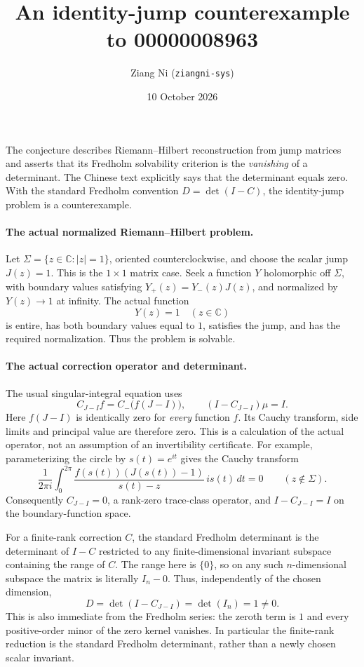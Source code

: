 \documentclass[11pt]{article}
\title{An identity-jump counterexample to 00000008963}
\author{Ziang Ni (\texttt{ziangni-sys})}
\date{10 October 2026}
\begin{document}
\maketitle
The conjecture describes Riemann--Hilbert reconstruction from jump
matrices and asserts that its Fredholm solvability criterion is the
\emph{vanishing} of a determinant. The Chinese text explicitly says
that the determinant equals zero. With the standard Fredholm
convention $D=\det(I-C)$, the identity-jump problem is a counterexample.

\paragraph{The actual normalized Riemann--Hilbert problem.}
Let $\Sigma=\{z\in\mathbb C:|z|=1\}$, oriented counterclockwise, and
choose the scalar jump $J(z)=1$. This is the $1\times1$ matrix case.
Seek a function $Y$ holomorphic off $\Sigma$, with boundary values
satisfying $Y_+(z)=Y_-(z)J(z)$, and normalized by $Y(z)\to1$ at
infinity. The actual function
\[
 Y(z)=1\quad(z\in\mathbb C)
\]
is entire, has both boundary values equal to $1$, satisfies the jump,
and has the required normalization. Thus the problem is solvable.

\paragraph{The actual correction operator and determinant.}
The usual singular-integral equation uses
\[
 C_{J-I}f=C_-\bigl(f(J-I)\bigr),\qquad (I-C_{J-I})\mu=I.
\]
Here $f(J-I)$ is identically zero for \emph{every} function $f$.
Its Cauchy transform, side limits and principal value are therefore
zero. This is a calculation of the actual operator, not an assumption
of an invertibility certificate. For example, parameterizing the circle
by $s(t)=e^{it}$ gives the Cauchy transform
\[
 \frac1{2\pi i}\int_0^{2\pi}
  \frac{f(s(t))(J(s(t))-1)}{s(t)-z}\,i s(t)\,dt=0
 \qquad (z\notin\Sigma).
\]
Consequently $C_{J-I}=0$, a rank-zero trace-class operator, and
$I-C_{J-I}=I$ on the boundary-function space.

For a finite-rank correction $C$, the standard Fredholm determinant
is the determinant of $I-C$ restricted to any finite-dimensional
invariant subspace containing the range of $C$. The range here is
$\{0\}$, so on any such $n$-dimensional subspace the matrix is
literally $I_n-0$. Thus, independently of the chosen dimension,
\[
 D=\det(I-C_{J-I})=\det(I_n)=1\ne0.
\]
This is also immediate from the Fredholm series: the zeroth term is
$1$ and every positive-order minor of the zero kernel vanishes.
In particular the finite-rank reduction is the standard Fredholm
determinant, rather than a newly chosen scalar invariant.
\end{document}
